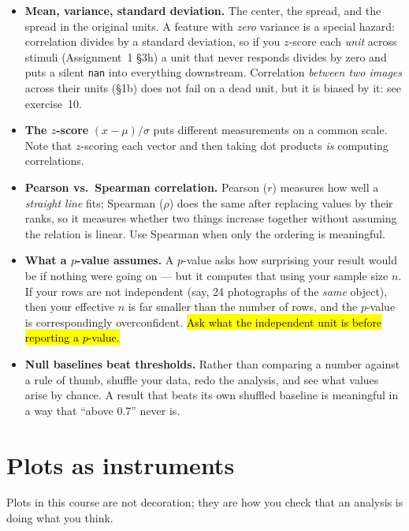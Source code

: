 \documentclass[11pt]{article}
\begin{document}
\begin{itemize}
\item \textbf{Mean, variance, standard deviation.} The center, the spread, and
      the spread in the original units. A feature with \emph{zero} variance is
      a special hazard: correlation divides by a standard deviation, so if you
      $z$-score each \emph{unit} across stimuli (Assignment~1 \S3h) a unit that
      never responds divides by zero and puts a silent \texttt{nan} into
      everything downstream. Correlation \emph{between two images} across their
      units (\S1b) does not fail on a dead unit, but it is biased by it: see
      exercise~10.
\item \textbf{The $z$-score} $(x - \mu)/\sigma$ puts different measurements on a
      common scale. Note that $z$-scoring each vector and then taking dot
      products \emph{is} computing correlations.
\item \textbf{Pearson vs.\ Spearman correlation.} Pearson ($r$) measures how
      well a \emph{straight line} fits; Spearman ($\rho$) does the same after
      replacing values by their ranks, so it measures whether two things increase together
      without assuming the relation is linear. Use Spearman when only the
      ordering is meaningful.
\item \textbf{What a $p$-value assumes.} A $p$-value asks how surprising your
      result would be if nothing were going on --- but it computes that using
      your sample size $n$. If your rows are not independent (say, 24
      photographs of the \emph{same} object), then your effective $n$ is far
      smaller than the number of rows, and the $p$-value is correspondingly
      overconfident. \hl{Ask what the independent unit is before reporting a
      $p$-value.}
\item \textbf{Null baselines beat thresholds.} Rather than comparing a number
      against a rule of thumb, shuffle your data, redo the analysis, and see
      what values arise by chance. A result that beats its own shuffled
      baseline is meaningful in a way that ``above 0.7'' never is.
\end{itemize}

\section{Plots as instruments}

Plots in this course are not decoration; they are how you check that an
analysis is doing what you think.
\end{document}
